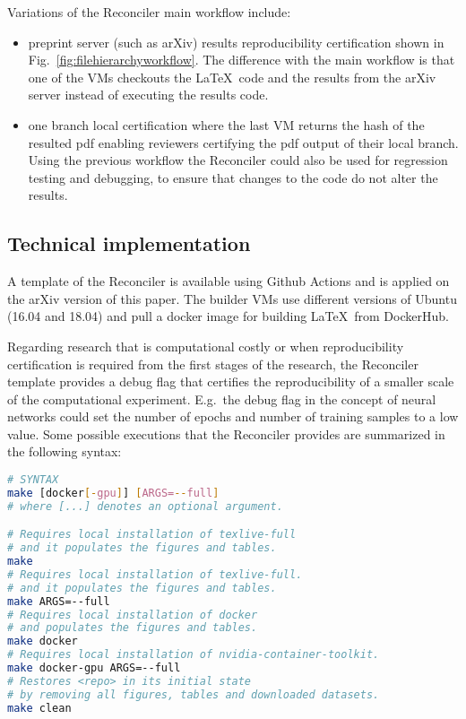 \documentclass[journal]{IEEEtran}
\begin{document}
Variations of the Reconciler main workflow include:
\begin{itemize}
	\item preprint server (such as arXiv) results reproducibility certification shown in Fig.~\ref{fig:filehierarchyworkflow}.
		The difference with the main workflow is that one of the VMs checkouts the \LaTeX\ code and the results from the arXiv server instead of executing the results code.
	\item one branch local certification where the last VM returns the hash of the resulted pdf enabling reviewers certifying the pdf output of their local branch.
		Using the previous workflow the Reconciler could also be used for regression testing and debugging, to ensure that changes to the code do not alter the results.
\end{itemize}

\subsection{Technical implementation}
A template of the Reconciler is available using Github Actions and is applied on the arXiv version of this paper.
The builder VMs use different versions of Ubuntu (16.04 and 18.04) and pull a docker image for building \LaTeX\ from DockerHub.

Regarding research that is computational costly or when reproducibility certification is required from the first stages of the research, the Reconciler template provides a debug flag that certifies the reproducibility of a smaller scale of the computational experiment.
E.g.\ the debug flag in the concept of neural networks could set the number of epochs and number of training samples to a low value.
Some possible executions that the Reconciler provides are summarized in the following syntax:
\begin{lstlisting}[language=Bash, style=lststyle, caption={Makefile call syntax from the shell.}, captionpos=b]
# SYNTAX
make [docker[-gpu]] [ARGS=--full]
# where [...] denotes an optional argument.

# Requires local installation of texlive-full
# and it populates the figures and tables.
make
# Requires local installation of texlive-full.
# and it populates the figures and tables.
make ARGS=--full
# Requires local installation of docker
# and populates the figures and tables.
make docker
# Requires local installation of nvidia-container-toolkit.
make docker-gpu ARGS=--full
# Restores <repo> in its initial state
# by removing all figures, tables and downloaded datasets.
make clean

\end{lstlisting}
\end{document}
